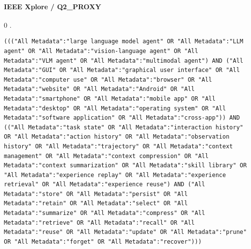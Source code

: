 \noindent\begin{minipage}{\linewidth}
\paragraph{IEEE Xplore / Q2\_PROXY}
0 .
\begin{lstlisting}
((("All Metadata":"large language model agent" OR "All Metadata":"LLM agent" OR "All Metadata":"vision-language agent" OR "All Metadata":"VLM agent" OR "All Metadata":"multimodal agent") AND ("All Metadata":"GUI" OR "All Metadata":"graphical user interface" OR "All Metadata":"computer use" OR "All Metadata":"browser" OR "All Metadata":"website" OR "All Metadata":"Android" OR "All Metadata":"smartphone" OR "All Metadata":"mobile app" OR "All Metadata":"desktop" OR "All Metadata":"operating system" OR "All Metadata":"software application" OR "All Metadata":"cross-app")) AND (("All Metadata":"task state" OR "All Metadata":"interaction history" OR "All Metadata":"action history" OR "All Metadata":"observation history" OR "All Metadata":"trajectory" OR "All Metadata":"context management" OR "All Metadata":"context compression" OR "All Metadata":"context summarization" OR "All Metadata":"skill library" OR "All Metadata":"experience replay" OR "All Metadata":"experience retrieval" OR "All Metadata":"experience reuse") AND ("All Metadata":"store" OR "All Metadata":"persist" OR "All Metadata":"retain" OR "All Metadata":"select" OR "All Metadata":"summarize" OR "All Metadata":"compress" OR "All Metadata":"retrieve" OR "All Metadata":"recall" OR "All Metadata":"reuse" OR "All Metadata":"update" OR "All Metadata":"prune" OR "All Metadata":"forget" OR "All Metadata":"recover")))
\end{lstlisting}
\end{minipage}\par\medskip
